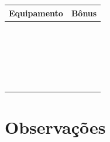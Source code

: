 \documentclass[a4paper,12pt]{article}
\begin{document}
\begin{multicols}{2}
\begin{center}
    \begin{tabular}{|m{6cm}|c|}
        \hline
        \textbf{Equipamento} & \textbf{Bônus} \\
        \hline
        & \\
        \hline
        & \\
        \hline
        & \\
        \hline
        & \\
        \hline
        & \\
        \hline
        & \\
        \hline
        & \\
        \hline
        & \\
        \hline
        & \\
        \hline
        & \\
        \hline
        & \\
        \hline
        & \\
        \hline
        & \\
        \hline
        & \\
                \hline
        & \\
                \hline
        & \\
                \hline
        & \\
                \hline
        & \\
                \hline
        & \\
                \hline
        & \\
                \hline
        & \\
                \hline
        & \\
                \hline
        & \\
        \hline
    \end{tabular}
\end{center}



\end{multicols}

\section*{Observações}
\begin{center}
    \fbox{
        \parbox{\textwidth}{
        \hspace{\textwidth}
        \vspace{10cm}
        }
    }
\end{center}
\end{document}
